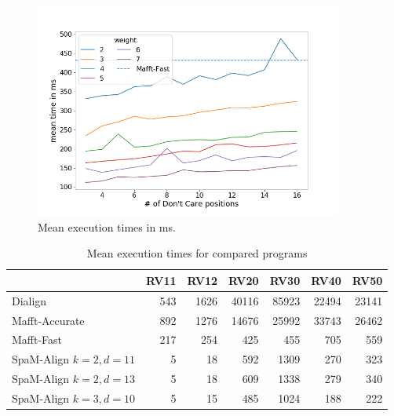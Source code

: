 \begin{figure}[h]
	\centering
	\includegraphics[width=0.9\textwidth]{../alignment-evaluation/time-by-pattern-params.png}
	\caption{Mean execution times in ms.}
	\label{fig:time-by-patterns}
\end{figure}

\begin{table}[h]
	\centering
	\begin{tabular}{lrrrrrr}
		\toprule
		{} &  RV11 &  RV12 &   RV20 &   RV30 &   RV40 &   RV50 \\
		\midrule
		Dialign             &   543 &  1626 &  40116 &  85923 &  22494 &  23141 \\
		Mafft-Accurate      &   892 &  1276 &  14676 &  25992 &  33743 &  26462 \\
		Mafft-Fast          &   217 &   254 &    425 &    455 &    705 &    559 \\
		SpaM-Align $k=2, d=11$ &     5 &    18 &    592 &   1309 &    270 &    323 \\
		SpaM-Align $k=2, d=13$ &     5 &    18 &    609 &   1338 &    279 &    340 \\
		SpaM-Align $k=3, d=10$ &     5 &    15 &    485 &   1024 &    188 &    222 \\
		\bottomrule
	\end{tabular}
	\caption{Mean execution times for compared programs}
	\label{tab:exec-times}
\end{table}
